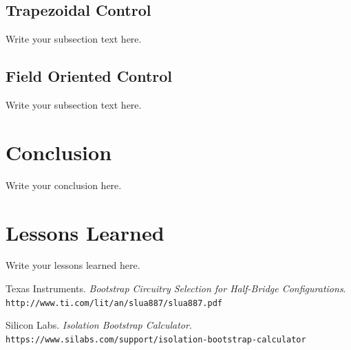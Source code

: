 \documentclass{article}
\begin{document}
		\subsection{Trapezoidal Control}
		Write your subsection text here.
		
		\subsection{Field Oriented Control}
		Write your subsection text here.
	
	\section{Conclusion}
	Write your conclusion here.
	
	\section{Lessons Learned}
	Write your lessons learned here.
	
	
	
	
	\begin{thebibliography}{9}
		Texas Instruments.
		\textit{Bootstrap Circuitry Selection for Half-Bridge Configurations}.
		\\\texttt{http://www.ti.com/lit/an/slua887/slua887.pdf}
		
		Silicon Labs. 
		\textit{Isolation Bootstrap Calculator}. 
		\\\texttt{https://www.silabs.com/support/isolation-bootstrap-calculator}
		
	\end{thebibliography}
	
	
	
\end{document}
